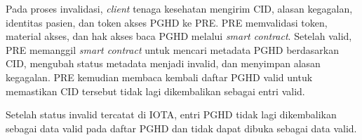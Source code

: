 \begin{enumerate}
	      Pada proses invalidasi, \textit{client} tenaga kesehatan mengirim CID, alasan kegagalan, identitas pasien, dan token akses PGHD ke PRE\@.
	      PRE memvalidasi token, material akses, dan hak akses baca PGHD melalui \textit{smart contract}.
	      Setelah valid, PRE memanggil \textit{smart contract} untuk mencari metadata PGHD berdasarkan CID, mengubah status metadata menjadi invalid, dan menyimpan alasan kegagalan.
	      PRE kemudian membaca kembali daftar PGHD valid untuk memastikan CID tersebut tidak lagi dikembalikan sebagai entri valid.

	      Setelah status invalid tercatat di IOTA, entri PGHD tidak lagi dikembalikan sebagai data valid pada daftar PGHD dan tidak dapat dibuka sebagai data valid.
\end{enumerate}
